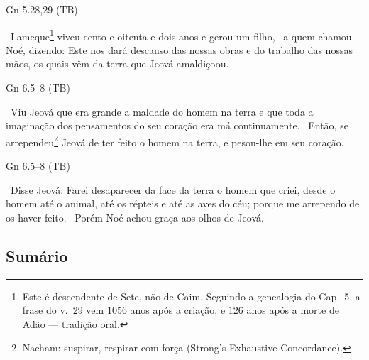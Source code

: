 \documentclass[12pt,aspectratio=169]{beamer}
\newcommand{\ver}[1]{%
    \raisebox{0.50ex}{%
        \scalebox{1.1}{%
            \pmb{\textbf{\textcolor{BSpbg}{#1}}}%
        }%
    }%
}
\newcommand{\QUOTE}[1]{%
    \par\noindent\hspace*{0.05\linewidth}%
    \begin{minipage}{0.9\linewidth}%
        \linespread{1.35}\large{#1}%
    \end{minipage}%
}
\newcommand{\RED}[1]{{\textcolor{TXred}{#1}}}
\newcommand{\YEL}[1]{{\textcolor{TXyel}{#1}}}
\newcommand{\GRE}[1]{{\textcolor{TXgre}{#1}}}
\newcommand{\BRI}[1]{{\textcolor{BSpbg}{#1}}}   %
\begin{document}
    \begin{frame}{Gn 5.28,29 (TB)}
        \QUOTE{%
            \ver{28}~Lameque\footnote{Este é descendente de Sete, não de Caim. Seguindo a
            genealogia do Cap.~5, a frase do v.~29 vem \BRI{$1056$ anos após a criação}, e
            \BRI{$126$ anos após a morte de Adão} --- tradição oral.} viveu cento e oitenta e
            dois anos e gerou um filho,
            \ver{29}~a quem chamou Noé, dizendo: Este nos dará \YEL{descanso das nossas obras e
            do trabalho} das nossas mãos, \YEL{os quais vêm da terra que Jeová amaldiçoou}.
        }
    \end{frame}

    \begin{frame}{Gn 6.5--8 (TB)}
        \QUOTE{%
            \ver{5}~Viu Jeová que era \RED{grande a maldade} do homem na terra e que \YEL{toda}
            a imaginação dos \RED{pensamentos} do seu coração era \RED{má} \YEL{continuamente}.
            \ver{6}~Então, se arrependeu\footnote{\YEL{Nacham}: \BRI{suspirar}, \BRI{respirar
            com força} (Strong's Exhaustive Concordance).} Jeová de ter feito o homem na terra,
            e pesou-lhe em seu coração.
        }
    \end{frame}

    \begin{frame}{Gn 6.5--8 (TB)}
        \QUOTE{%
            \ver{7}~Disse Jeová: Farei \RED{desaparecer da face da terra o homem que criei},
            desde o homem até o animal, até os répteis e até as aves do céu; porque me arrependo
            de os haver feito.
            \ver{8}~\GRE{Porém Noé achou graça aos olhos de Jeová}.
        }
    \end{frame}

    \subsection{Sumário}
\end{document}
